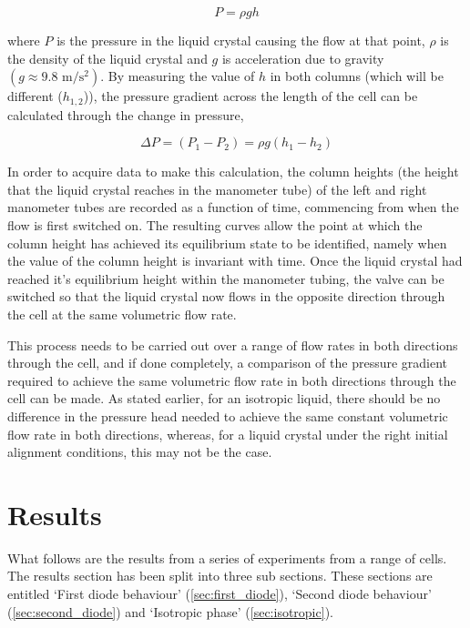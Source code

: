 \begin{equation}
P=\rho gh
\end{equation}

\noindent where $P$ is the pressure in the liquid crystal causing the flow at that point, $\rho$ is the density of the liquid crystal and $g$ is acceleration due to gravity $\left(g\approx9.8 \text{ m/s$^2$}\right)$. By measuring the value of $h$ in both columns (which will be different ($h_{1,2}$)), the pressure gradient across the length of the cell can be calculated through the change in pressure,

\begin{equation}
\Delta P=\left(P_1-P_2\right)=\rho g \left(h_1-h_2\right)
\label{eq:pressures}
\end{equation}

In order to acquire data to make this calculation, the column heights (the height that the liquid crystal reaches in the manometer tube) of the left and right manometer tubes are recorded as a function of time, commencing from when the flow is first switched on. The resulting curves allow the point at which the column height has achieved its equilibrium state to be identified, namely when the value of the column height is invariant with time. Once the liquid crystal had reached it's equilibrium height within the manometer tubing, the valve can be switched so that the liquid crystal now flows in the opposite direction through the cell at the same volumetric flow rate.

This process needs to be carried out over a range of flow rates in both directions through the cell, and if done completely, a comparison of the pressure gradient required to achieve the same volumetric flow rate in both directions through the cell can be made. As stated earlier, for an isotropic liquid, there should be no difference in the pressure head needed to achieve the same constant volumetric flow rate in both directions, whereas, for a liquid crystal under the right initial alignment conditions, this may not be the case.



\section{Results}
What follows are the results from a series of experiments from a range of cells. The results section has been split into three sub sections. These sections are entitled `First diode behaviour' (\ref{sec:first_diode}), `Second diode behaviour' (\ref{sec:second_diode}) and `Isotropic phase' (\ref{sec:isotropic}).


